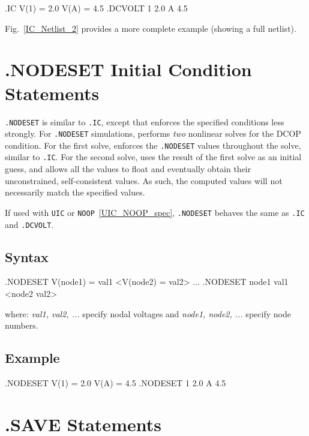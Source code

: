 \begin{vquote}
.IC V(1) = 2.0  V(A) = 4.5
.DCVOLT  1 2.0 A 4.5
\end{vquote}

Fig.~\ref{IC_Netlist_2} provides a more complete example (showing a full netlist).

\newpage
\section{.NODESET Initial Condition Statements}
\label{NODESET_statement_spec}


\texttt{.NODESET} is similar to \texttt{.IC}, except that \Xyce{}
enforces the specified conditions less strongly.  For
\texttt{.NODESET} simulations, \Xyce{} performs {\em two} nonlinear
solves for the DCOP condition.  For the first solve, \Xyce{} enforces
the \texttt{.NODESET} values throughout the solve, similar to
\texttt{.IC}.  For the second solve, \Xyce{} uses the result of the
first solve as an initial guess, and allows all the values to float
and eventually obtain their unconstrained, self-consistent values.  As
such, the computed values will not necessarily match the specified
values.  

If used with \texttt{UIC} or \texttt{NOOP}~\ref{UIC_NOOP_spec}, \texttt{.NODESET} 
behaves the same as \texttt{.IC} and \texttt{.DCVOLT}. 

\subsection{Syntax}

\begin{vquote}
.NODESET V(node1) = val1 <V(node2) = val2> ...
.NODESET node1 val1 <node2 val2>
\end{vquote}

where:  \emph{val1, val2, ...} specify nodal voltages and \emph{node1, node2, ...} specify node numbers.

\subsection{Example}

\begin{vquote}
.NODESET V(1) = 2.0  V(A) = 4.5
.NODESET  1 2.0 A 4.5
\end{vquote}

\newpage
\section{.SAVE Statements}
\label{SAVE_statement_spec}


